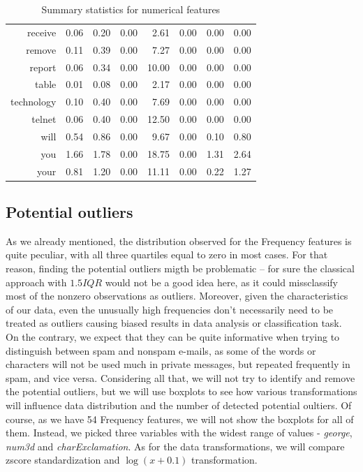 \documentclass{article}\usepackage[]{graphicx}\usepackage[]{xcolor}
\begin{document}
\begin{table}[ht]
\begin{tabular}{rrrrrrrr}
  receive & 0.06 & 0.20 & 0.00 & 2.61 & 0.00 & 0.00 & 0.00 \\ 
  remove & 0.11 & 0.39 & 0.00 & 7.27 & 0.00 & 0.00 & 0.00 \\ 
  report & 0.06 & 0.34 & 0.00 & 10.00 & 0.00 & 0.00 & 0.00 \\ 
  table & 0.01 & 0.08 & 0.00 & 2.17 & 0.00 & 0.00 & 0.00 \\ 
  technology & 0.10 & 0.40 & 0.00 & 7.69 & 0.00 & 0.00 & 0.00 \\ 
  telnet & 0.06 & 0.40 & 0.00 & 12.50 & 0.00 & 0.00 & 0.00 \\ 
  will & 0.54 & 0.86 & 0.00 & 9.67 & 0.00 & 0.10 & 0.80 \\ 
  you & 1.66 & 1.78 & 0.00 & 18.75 & 0.00 & 1.31 & 2.64 \\ 
  your & 0.81 & 1.20 & 0.00 & 11.11 & 0.00 & 0.22 & 1.27 \\ 
   \hline
\end{tabular}
\caption{Summary statistics for numerical features} 
\label{tab1}
\end{table}


\subsection*{Potential outliers}

As we already mentioned, the distribution observed for the Frequency features is quite peculiar,
with all three quartiles equal to zero in most cases. For that reason, finding the
potential outliers migth be problematic -- for sure the classical approach with $1.5IQR$
would not be a good idea here, as it could missclassify most of the nonzero observations 
as outliers. Moreover, given the characteristics of our data, even the unusually high
frequencies don't necessarily need to be treated as outliers causing biased results
in data analysis or classification task. On the contrary, we expect that they can be 
quite informative when trying to distinguish between spam and nonspam e-mails, as 
some of the words or characters will not be used much in private messages, but repeated
frequently in spam, and vice versa. Considering all that, we will not try to identify and 
remove the potential outliers, but we will use boxplots to see how various transformations
will influence data distribution and the number of detected potential oultiers. Of course, 
as we have 54 Frequency features, we will not show the boxplots for all of them.
Instead, we picked three variables with the widest range of values - \textit{george},
\textit{num3d} and \textit{charExclamation}. As for the data transformations, 
we will compare zscore standardization and $\log(x+0.1)$ transformation.
\end{document}
